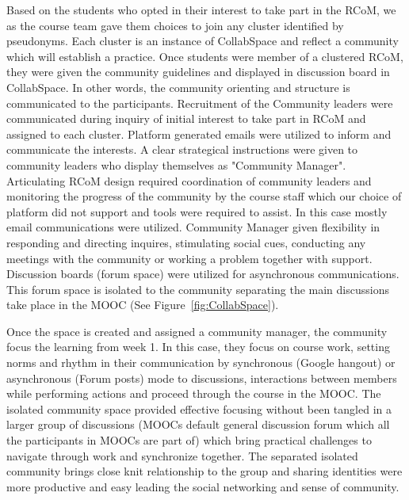 \documentclass[format=acmsmall, review=false, screen=true]{acmart}
\newcommand{\msb}[1]{{\textcolor{blue}{ [Michael: #1]}}}
\begin{document}

Based on the students who opted in their interest to take part in the RCoM, we as the course team gave them choices to join any cluster identified by pseudonyms. Each cluster is an instance of CollabSpace and reflect a community which will establish a practice. Once students were member of a clustered RCoM, they were given the community guidelines and displayed in discussion board in CollabSpace. In other words, the community orienting and structure is communicated to the participants. Recruitment of the Community leaders were communicated during inquiry of initial interest to take part in RCoM and assigned to each cluster. Platform generated emails were utilized to inform and communicate the interests. A clear strategical instructions were given to community leaders who display themselves as "Community Manager". Articulating RCoM design required coordination of community leaders and monitoring the progress of the community by the course staff which our choice of platform did not support and tools were required to assist. In this case mostly email communications were utilized. Community Manager given flexibility in responding and directing inquires, stimulating social cues, conducting any meetings with the community or working a problem together with support. Discussion boards (forum space) were utilized for asynchronous communications. This forum space is isolated to the community separating the main discussions take place in the MOOC (See Figure~\ref{fig:CollabSpace}).

Once the space is created and assigned a community manager, the community focus the learning from week 1. In this case, they focus on course work, setting norms and rhythm in their communication by synchronous (Google hangout) or asynchronous (Forum posts) mode to discussions, interactions between members while performing actions and proceed through the course in the MOOC. The isolated community space provided effective focusing without been tangled in a larger group of discussions (MOOCs default general discussion forum which all the participants in MOOCs are part of) which bring practical challenges to navigate through work and synchronize together. The separated isolated community brings close knit relationship to the group and sharing identities were more productive and easy leading the social networking and sense of community. 
\end{document}
